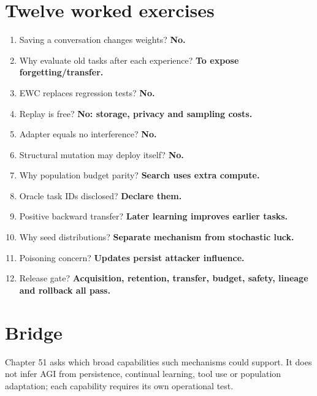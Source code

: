 \section{Twelve worked exercises}
\begin{enumerate}
\item Saving a conversation changes weights? \textbf{No.}
\item Why evaluate old tasks after each experience? \textbf{To expose forgetting/transfer.}
\item EWC replaces regression tests? \textbf{No.}
\item Replay is free? \textbf{No: storage, privacy and sampling costs.}
\item Adapter equals no interference? \textbf{No.}
\item Structural mutation may deploy itself? \textbf{No.}
\item Why population budget parity? \textbf{Search uses extra compute.}
\item Oracle task IDs disclosed? \textbf{Declare them.}
\item Positive backward transfer? \textbf{Later learning improves earlier tasks.}
\item Why seed distributions? \textbf{Separate mechanism from stochastic luck.}
\item Poisoning concern? \textbf{Updates persist attacker influence.}
\item Release gate? \textbf{Acquisition, retention, transfer, budget, safety, lineage and rollback all pass.}
\end{enumerate}

\section{Bridge}
Chapter 51 asks which broad capabilities such mechanisms could support. It does not infer AGI from persistence, continual learning, tool use or population adaptation; each capability requires its own operational test.
